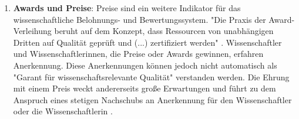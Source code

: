 \begin{enumerate}
\item \textbf{Awards und Preise}: Preise sind ein weitere Indikator für das wissenschaftliche Belohnungs- und Bewertungssystem. "Die Praxis der Award-Verleihung beruht auf dem Konzept, dass Ressourcen von unabhängigen Dritten auf Qualität geprüft und (...) zertifiziert werden" \cite{bargheer_2002_qualitatskriterien}. Wissenschaftler und Wissenschaftlerinnen, die Preise oder Awards gewinnen, erfahren Anerkennung. Diese Anerkennungen können jedoch nicht automatisch als "Garant für wissenschaftsrelevante Qualität"\cite{bargheer_2002_qualitatskriterien} verstanden werden. Die Ehrung mit einem Preis weckt andererseits große Erwartungen und führt zu dem Anspruch eines stetigen Nachschubs an Anerkennung für den Wissenschaftler oder die Wissenschaftlerin \cite{suchen}.
\end{enumerate}
